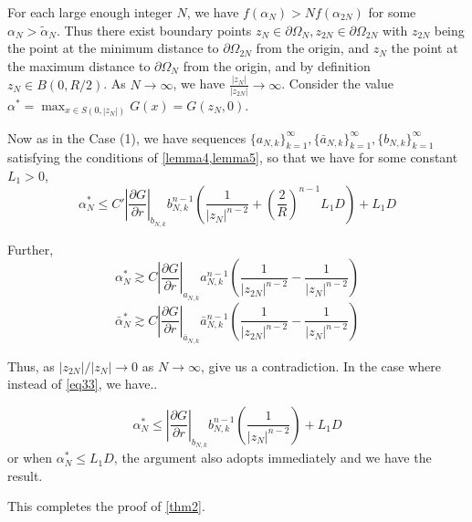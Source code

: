 \documentclass{article}
\newcounter{lem}
\theoremstyle{plain}
\theoremstyle{definition}
\theoremstyle{plain}
\begin{document}
For each large enough integer $N$, we have $f(\alpha_N) > N f(\alpha_{2N})$ for some $\alpha_N > \tilde{\alpha}_N$. Thus there exist boundary points $z_N \in \partial \Omega_N, z_{2N} \in \partial \Omega_{2N}$ with $z_{2N}$ being the point at the minimum distance to $\partial \Omega_{2N}$ from the origin, and $z_N$ the point at the maximum distance to $\partial \Omega_N$ from the origin, and by definition $z_N \in B(0, R/2)$.
As $N \to \infty$, we have $\frac{|z_N|}{|z_{2N}|} \to \infty$. Consider the value $\alpha^* = \max_{x \in S(0, |z_N|)} G(x) = G(z_N, 0)$.

Now as in the Case (1), we have sequences $\{a_{N,k}\}_{k=1}^{\infty}, \{\bar{a}_{N,k}\}_{k=1}^{\infty}, \{b_{N,k}\}_{k=1}^{\infty}$ satisfying the conditions of \cref{lemma4,lemma5}, so that we have for some constant $L_1>0$,
\begin{equation} \label{eq33}
\alpha_N^* \le C' \left| \frac{\partial G}{\partial r} \right|_{b_{N,k}} b_{N,k}^{n-1} \left( \frac{1}{|z_N|^{n-2}} + \left( \frac{2}{R} \right)^{n-1} L_1 D \right) + L_1 D
\end{equation}

Further,
\begin{equation} \label{eq34}
\alpha_N^* \gtrsim C \left| \frac{\partial G}{\partial r} \right|_{a_{N,k}} a_{N,k}^{n-1} \left( \frac{1}{|z_{2N}|^{n-2}} - \frac{1}{|z_N|^{n-2}} \right)
\end{equation}
\begin{equation} \label{eq35}
\bar{\alpha}_N^* \gtrsim C \left| \frac{\partial G}{\partial r} \right|_{\bar{a}_{N,k}} \bar{a}_{N,k}^{n-1} \left( \frac{1}{|z_{2N}|^{n-2}} - \frac{1}{|z_N|^{n-2}} \right)
\end{equation}

Thus, as $|z_{2N}|/|z_N| \to 0$ as $N \to \infty$, \label{eq33,eq34,eq35} give us a contradiction. In the case where instead of \cref{eq33}, we have..

\begin{equation*}
\alpha_N^* \le \left| \frac{\partial G}{\partial r} \right|_{b_{N,k}} b_{N,k}^{n-1} \left( \frac{1}{|z_N|^{n-2}} \right) + L_1 D
\end{equation*}
or when $\alpha_N^* \le L_1 D$, the argument also adopts immediately and we have the result.

This completes the proof of \cref{thm2}.\quad
\vspace{1em}
\end{document}
